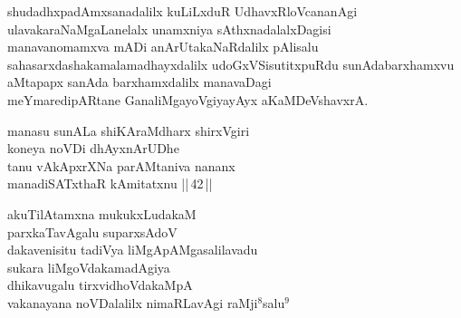 \begin{entry}
\end{entry}

\begin{entry}
\begin{shl}
shudadhxpadAmxsanadalilx kuLiLxduR UdhavxRloVcananAgi\\
ulavakaraNaMgaLanelalx unamxniya sAthxnadalalxDagisi\\
manavanomamxva mADi anArUtakaNaRdalilx pAlisalu\\
sahasarxdashakamalamadhayxdalilx udoGxVSisutitxpuRdu sunAdabarxhamxvu\\
aMtapapx sanAda barxhamxdalilx manavaDagi\\
meYmaredipARtane GanaliMgayoVgiyayAyx aKaMDeVshavxrA.
\end{shl}
\end{entry}

\begin{entry}
\begin{shl}
manasu sunALa shiKAraMdharx shirxVgiri\\
koneya noVDi dhAyxnArUDhe\\
tanu vAkApxrXNa parAMtaniva nananx\\
manadiSATxthaR kAmitatxnu ||\,42\,||
\end{shl}
\end{entry}

\begin{entry}
\begin{shl}
akuTilAtamxna mukukxLudakaM\\
parxkaTavAgalu suparxsAdoV\\
dakavenisitu tadiVya liMgApAMgasalilavadu\\
sukara liMgoVdakamadAgiya\\
dhikavugalu tirxvidhoVdakaMpA\\
vakanayana noVDalalilx nimaRLavAgi raMji$^8$salu$^9$
\end{shl}
\end{entry}

\begin{entry}
\end{entry}

